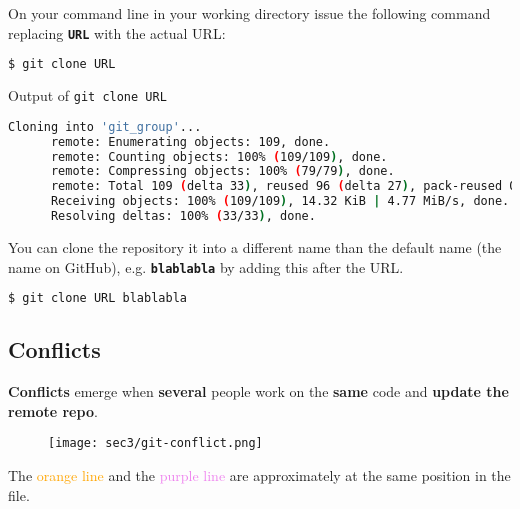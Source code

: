 \begin{frame}[fragile]
\emptyframetitle

  On your command line in your working directory issue the following command replacing \textbf{\texttt{URL}} with the actual URL:

  \begin{lstlisting}[language=bash]
    $ git clone URL 
  \end{lstlisting}

  \vspace*{-0.25cm}
  \begin{block}{Output of \texttt{git clone URL}}
  \vspace*{-0.25cm}
    \begin{lstlisting}[language=bash, basicstyle=\footnotesize\ttfamily]
      Cloning into 'git_group'...
      remote: Enumerating objects: 109, done.
      remote: Counting objects: 100% (109/109), done.
      remote: Compressing objects: 100% (79/79), done.
      remote: Total 109 (delta 33), reused 96 (delta 27), pack-reused 0
      Receiving objects: 100% (109/109), 14.32 KiB | 4.77 MiB/s, done.
      Resolving deltas: 100% (33/33), done.
    \end{lstlisting}
  \end{block}

  You can clone the repository it into a different name than the default name (the name on GitHub), e.g. \textbf{\texttt{blablabla}} by adding this after the URL. 

  \begin{lstlisting}[language=bash]
    $ git clone URL blablabla
  \end{lstlisting}
 
\end{frame}

\subsection{Conflicts}\hypertarget{sec3.3}{}

\begin{frame}[fragile]
\emptyframetitle

  \textbf{Conflicts} emerge when \textbf{several} people work on the \textbf{same} code and \textbf{update the remote repo}.\\[0.25cm]

  \begin{figure}[h]
    \texttt{[image: sec3/git-conflict.png]}
  \end{figure}

  The \textcolor{orange}{orange line} and the \textcolor{violet}{purple line} are approximately at the same position in the file. 

\end{frame}

